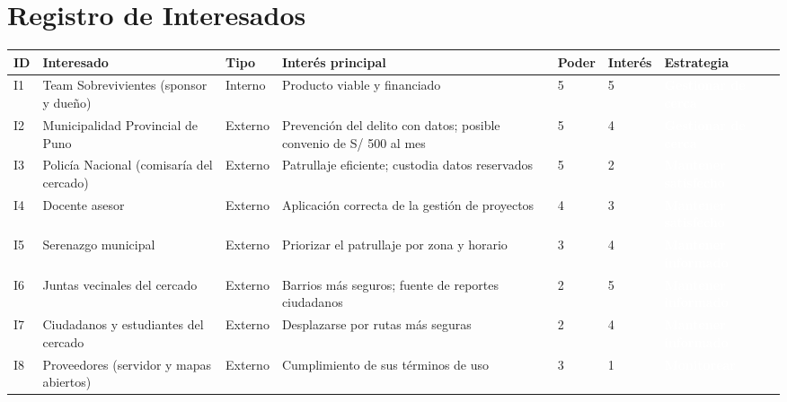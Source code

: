 \documentclass[11pt,a4paper]{article}
\newcommand{\etiqueta}[2]{{\setlength{\fboxsep}{2pt}\colorbox{#1}{\textcolor{white}{\scriptsize\bfseries #2}}}}
\newcommand{\cerca}{\etiqueta{CuadCerca}{Gestionar de cerca}}
\newcommand{\satisf}{\etiqueta{CuadSatisf}{Mantener satisfecho}}
\newcommand{\informado}{\etiqueta{CuadInfo}{Mantener informado}}
\newcommand{\monit}{\etiqueta{CuadMonit}{Monitorear}}
\begin{document}
\section{Registro de Interesados}
{\small
\setlength{\tabcolsep}{4pt}
\noindent\begin{tabularx}{\textwidth}{@{}C{0.6cm} P{2.9cm} C{1.25cm} L C{1.0cm} C{1.1cm} C{2.9cm}@{}}
\toprule
{}
\textbf{ID} & \textbf{Interesado} & \textbf{Tipo} & \textbf{Interés principal} & \textbf{Poder} & \textbf{Interés} & \textbf{Estrategia} \\
\midrule
I1 & Team Sobrevivientes (sponsor y dueño) & Interno & Producto viable y financiado & 5 & 5 & \cerca \\
I2 & Municipalidad Provincial de Puno & Externo & Prevención del delito con datos; posible convenio de S/ 500 al mes & 5 & 4 & \cerca \\
I3 & Policía Nacional (comisaría del cercado) & Externo & Patrullaje eficiente; custodia datos reservados & 5 & 2 & \satisf \\
I4 & Docente asesor & Externo & Aplicación correcta de la gestión de proyectos & 4 & 3 & \satisf \\
I5 & Serenazgo municipal & Externo & Priorizar el patrullaje por zona y horario & 3 & 4 & \informado \\
I6 & Juntas vecinales del cercado & Externo & Barrios más seguros; fuente de reportes ciudadanos & 2 & 5 & \informado \\
I7 & Ciudadanos y estudiantes del cercado & Externo & Desplazarse por rutas más seguras & 2 & 4 & \informado \\
I8 & Proveedores (servidor y mapas abiertos) & Externo & Cumplimiento de sus términos de uso & 3 & 1 & \monit \\
\bottomrule
\end{tabularx}
}
\end{document}
